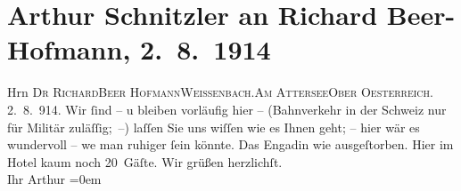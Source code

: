 

         
         \renewcommand{\erwaehntePersonen}{Personen: Richard Beer-Hofmann}
         \renewcommand{\erwaehnteOrte}{Orte: Attersee, Celerina, Cresta Palace, Engadin, Oberösterreich, Schweiz, Weißenbach am Attersee}
         \renewcommand{\erwaehnteWerke}{}
               \section[Arthur Schnitzler an Richard Beer-Hofmann, 2. 8. 1914]{ Arthur Schnitzler an Richard Beer-Hofmann, 2. 8. 1914}\nopagebreak{}\rehead{ }\begin{ledgroupsized}[t]{13cm}\normalsize\beginnumbering \toendnotes[C]{\smallbreak\pagebreak[2]} 
\toendnotes[C]{\smallbreak}\pstart{}{\pb}Hrn \textsc{Dr Richard}\pend{}\pstart{}\textsc{Beer Hofmann}\pend{}\pstart{}\textsc{Weissenbach.}\pend{}\pstart{}\textsc{Am Attersee}\pend{}\pstart{}\textsc{Ober Oesterreich}.\pend{}{\bigskip}\pstart
           \noindent{}\centering{}{\pb}\textcolor{gray}{\textbf{\label{T_L02189-1v}\label{T_L02189-1h}}}\pend
           \pstart
           {\pb}2. 8. 914. Wir ſind – u bleiben vorläufig hier –
               (Bahnverkehr in der Schweiz nur für Militär
               zuläſſig; –) laſſen Sie uns wiſſen wie es Ihnen geht; – hier wär es wundervoll – we{\geminationn} man ruhiger {\pb}ſein
               könnte. Das Engadin wie ausgeſtorben. Hier im Hotel kaum noch 20 Gäſte.\pend
           \pstart
           Wir grüßen herzlichſt.{\\[\baselineskip]}Ihr \spacefill\mbox{Arthur}\pend
           \leftskip=0em{}
         
         \endnumbering{}\end{ledgroupsized}  \newcommand{\dateiname}{L02189}\newcommand{\titel}{Arthur Schnitzler an Richard Beer-Hofmann, 2. 8. 1914}\newcommand{\editorInnen}{Martin Anton Müller und Gerd-Hermann Susen}
      